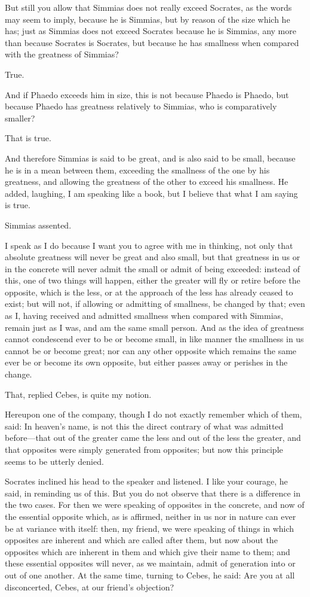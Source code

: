 But still you allow that Simmias does not really exceed Socrates, as the
words may seem to imply, because he is Simmias, but by reason of the size
which he has; just as Simmias does not exceed Socrates because he is
Simmias, any more than because Socrates is Socrates, but because he has
smallness when compared with the greatness of Simmias?

True.

And if Phaedo exceeds him in size, this is not because Phaedo is Phaedo,
but because Phaedo has greatness relatively to Simmias, who is
comparatively smaller?

That is true.

And therefore Simmias is said to be great, and is also said to be small,
because he is in a mean between them, exceeding the smallness of the one
by his greatness, and allowing the greatness of the other to exceed his
smallness. He added, laughing, I am speaking like a book, but I believe
that what I am saying is true.

Simmias assented.

I speak as I do because I want you to agree with me in thinking, not only
that absolute greatness will never be great and also small, but that
greatness in us or in the concrete will never admit the small or admit of
being exceeded: instead of this, one of two things will happen, either the
greater will fly or retire before the opposite, which is the less, or at
the approach of the less has already ceased to exist; but will not, if
allowing or admitting of smallness, be changed by that; even as I, having
received and admitted smallness when compared with Simmias, remain just as
I was, and am the same small person. And as the idea of greatness cannot
condescend ever to be or become small, in like manner the smallness in us
cannot be or become great; nor can any other opposite which remains the
same ever be or become its own opposite, but either passes away or
perishes in the change.

That, replied Cebes, is quite my notion.

Hereupon one of the company, though I do not exactly remember which of
them, said: In heaven's name, is not this the direct contrary of what was
admitted before—that out of the greater came the less and out of the
less the greater, and that opposites were simply generated from opposites;
but now this principle seems to be utterly denied.

Socrates inclined his head to the speaker and listened. I like your
courage, he said, in reminding us of this. But you do not observe that
there is a difference in the two cases. For then we were speaking of
opposites in the concrete, and now of the essential opposite which, as is
affirmed, neither in us nor in nature can ever be at variance with itself:
then, my friend, we were speaking of things in which opposites are
inherent and which are called after them, but now about the opposites
which are inherent in them and which give their name to them; and these
essential opposites will never, as we maintain, admit of generation into
or out of one another. At the same time, turning to Cebes, he said: Are
you at all disconcerted, Cebes, at our friend's objection?

